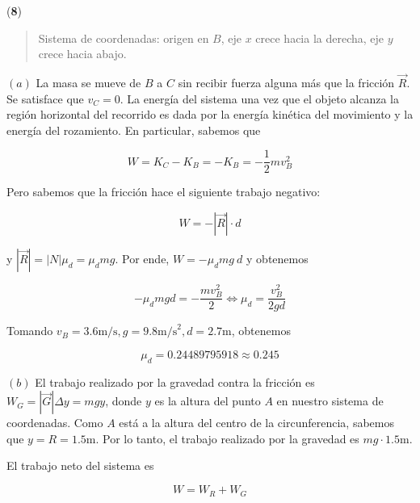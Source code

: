 \documentclass[12pt]{article}
\theoremstyle{definition}
\begin{document}
\begin{shaded}
    (\textbf{8})
\end{shaded}


\small
\begin{quote}

Sistema de coordenadas: origen en $B$, eje $x$ crece hacia la derecha, eje $y$
crece hacia abajo.

\end{quote}
\normalsize


$(a)$ La masa se mueve de $B$ a $C$ sin recibir fuerza alguna más que la
fricción $\vec{R}$. Se satisface que $v_C = 0$. La energía del sistema una vez
que el objeto alcanza la región horizontal del recorrido es dada por la energía
kinética del movimiento y la energía del rozamiento. En particular, sabemos que 

\begin{equation*}
    W = K_C - K_B = -K_B = -\frac{1}{2}mv_B^2
\end{equation*}

Pero sabemos que la fricción hace el siguiente trabajo negativo:

\begin{equation*}
    W = -\left| \vec{R} \right| \cdot d
\end{equation*}

y $\left| \vec{R} \right| = \left| N \right| \mu_d =
\mu_d mg$. Por ende, $W = -\mu_d mg ~ d$ y obtenemos 

\begin{equation*}
    -\mu_d mgd = -\frac{mv_B^2}{2} \iff \mu_d = \frac{v_B^2 }{2gd}
\end{equation*}

Tomando $v_B = 3.6\text{m/s}, g = 9.8\text{m/s}^2, d = 2.7\text{m}$, obtenemos 

\begin{equation*}
    \mu_d = 0.24489795918 \approx 0.245
\end{equation*}

$(b)$ El trabajo realizado por la gravedad contra la fricción es $W_G = \left|
\vec{G} \right| \Delta y = mg y$, donde $y$ es la altura del punto $A$ en
nuestro sistema de coordenadas. Como $A$ está a la altura del centro de la
circunferencia, sabemos que $y = R = 1.5\text{m}$. Por lo tanto, el trabajo
realizado por la gravedad es $mg \cdot 1.5 \text{m}$.

El trabajo neto del sistema es 

\begin{equation*}
    W = W_R + W_G 
\end{equation*}
\end{document}
